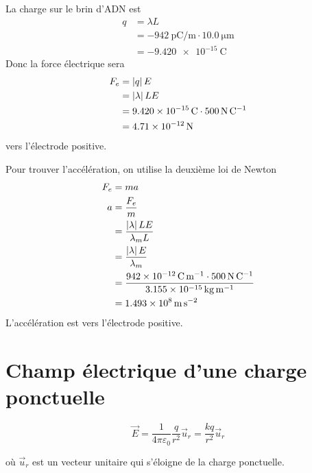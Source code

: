 \begin{reponsebox}
  La charge sur le brin d'ADN est
  \begin{align*}
    q &= \lambda L \\
      &= \SI{-942}{\pico\coulomb\per\meter} \cdot \SI{10.0}{\micro\meter} \\
      &= \SI{-9.420e-15}{\coulomb}
  \end{align*}
  Donc la force électrique sera
  \begin{align*}
    F_e &= \left| q \right| E \\
        &= \left| \lambda \right| L E  \\
        &= \SI{9.420e-15}{\coulomb} \cdot \SI{500}{\newton\per\coulomb} \\
        &= \SI{4.71e-12}{\newton}
  \end{align*}
  vers l'électrode positive.

  Pour trouver l'accélération, on utilise la deuxième loi de Newton
  \begin{align*}
    F_e &= ma  \\
    a &= \frac{F_e}{m}  \\
      &= \frac{\left| \lambda \right|LE}{\lambda_m L} \\
      &= \frac{\left| \lambda \right|E}{\lambda_m} \\
      &= \frac{\SI{942e-12}{\coulomb\per\meter} \cdot
        \SI{500}{\newton\per\coulomb}}{\SI{3.155e-15}{\kilogram\per\meter}}  \\
      &= \SI{1.493e8}{\meter\per\second\squared}
  \end{align*}
  L'accélération est vers l'électrode positive.
\end{reponsebox}


\section{Champ électrique d'une charge ponctuelle}

  $$\vec{E} = \frac{1}{4\pi\varepsilon_0}\frac{q}{r^2} \vec{u}_{r} = \frac{kq}{r^2} \vec{u}_{r}$$

  où $\vec{u}_r$ est un vecteur unitaire qui s'éloigne de la charge ponctuelle.

  \begin{center}
  \end{center}




